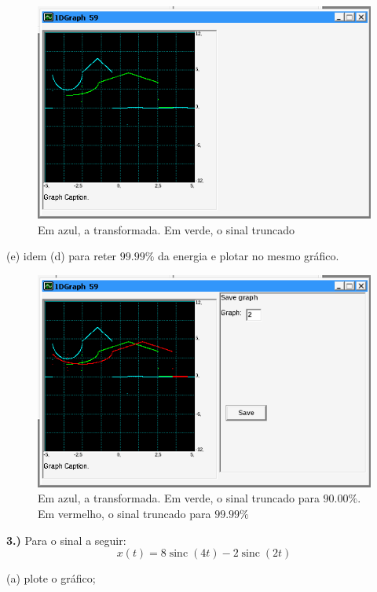 \documentclass[10pt]{article}
\DeclareMathOperator{\sinc}{sinc}
\begin{document}
\begin{figure}[h]
    \includegraphics[scale=0.4]{plot2d.png}
    \centering
    \caption{Em azul, a transformada. Em verde, o sinal truncado}
\end{figure}

\newpage

(e) idem (d) para reter $99.99\%$ da energia e plotar no mesmo gráfico.

\begin{figure}[h]
    \includegraphics[scale=0.4]{plot2e.png}
    \centering
    \caption{Em azul, a transformada. Em verde, o sinal truncado para $90.00\%$. Em vermelho, o sinal truncado para $99.99\%$}
\end{figure}

\vspace{\baselineskip}

\textbf{3.)} Para o sinal a seguir:
\[x(t) = 8\sinc(4t) - 2\sinc(2t)\]

(a) plote o gráfico;
\end{document}
